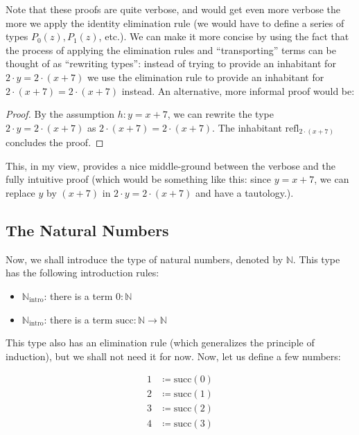 \documentclass[12pt]{article}
\theoremstyle{definition}
\theoremstyle{remark}
\newcommand{\doublequotes}[1]{``#1''}
\begin{document}
Note that these proofs are quite verbose, and would get even more verbose the more we apply the identity elimination rule (we would have to define a series of types $P_0(z), P_1(z)$, etc.). We can make it more concise by using the fact that the process of applying the elimination rules and \doublequotes{transporting} terms can be thought of as \doublequotes{rewriting types}: instead of trying to provide an inhabitant for $2 \cdot y = 2 \cdot (x + 7)$ we use the elimination rule to provide an inhabitant for $2 \cdot (x + 7) = 2 \cdot (x + 7)$ instead. An alternative, more informal proof would be:
\begin{proof}
By the assumption $h: y = x+7$, we can rewrite the type $2 \cdot y = 2 \cdot (x+7)$ as $2 \cdot (x+7) = 2 \cdot (x+7)$. The inhabitant $\text{refl}_{2 \cdot (x+7)}$ concludes the proof.
\end{proof}

This, in my view, provides a nice middle-ground between the verbose and the fully intuitive proof (which would be something like this: since $y = x+7$, we can replace $y$ by $(x+7)$ in $2 \cdot y = 2 \cdot (x+7)$ and have a tautology.). 

\subsection{The Natural Numbers}

Now, we shall introduce the type of natural numbers, denoted by $\mathbb{N}$. This type has the following introduction rules:

\begin{itemize}
  \item $\mathbb{N}_{\text{intro}}$: there is a term $0: \mathbb{N}$
  \item $\mathbb{N}_{\text{intro}}$: there is a term $\text{succ}: \mathbb{N} \to \mathbb{N}$
\end{itemize}

This type also has an elimination rule (which generalizes the principle of induction), but we shall not need it for now. Now, let us define a few numbers:

\begin{equation}
  \begin{aligned}
    1 &\coloneqq \text{succ}(0) \\
    2 &\coloneqq \text{succ}(1) \\
    3 &\coloneqq \text{succ}(2) \\
    4 &\coloneqq \text{succ}(3)
  \end{aligned}
\end{equation}
\end{document}
